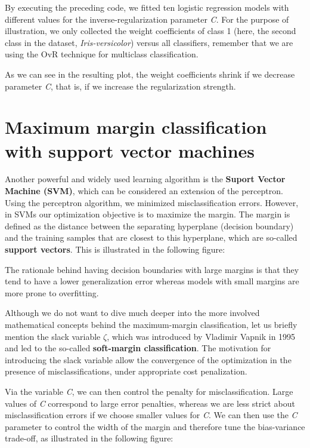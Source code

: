 \documentclass[11pt]{article}
\begin{document}
    By executing the preceding code, we fitted ten logistic regression
models with different values for the inverse-regularization parameter
\emph{C}. For the purpose of illustration, we only collected the weight
coefficients of class 1 (here, the second class in the dataset,
\emph{Iris-versicolor}) versus all classifiers, remember that we are
using the OvR technique for multiclass classification.

As we can see in the resulting plot, the weight coefficients shrink if
we decrease parameter \emph{C}, that is, if we increase the
regularization strength.

    \section{Maximum margin classification with support vector
machines}\label{maximum-margin-classification-with-support-vector-machines}

    Another powerful and widely used learning algorithm is the
\textbf{Suport Vector Machine (SVM)}, which can be considered an
extension of the perceptron. Using the perceptron algorithm, we
minimized misclassification errors. However, in SVMs our optimization
objective is to maximize the margin. The margin is defined as the
distance between the separating hyperplane (decision boundary) and the
training samples that are closest to this hyperplane, which are
so-called \textbf{support vectors}. This is illustrated in the following
figure:

The rationale behind having decision boundaries with large margins is
that they tend to have a lower generalization error whereas models with
small margins are more prone to overfitting.

Although we do not want to dive much deeper into the more involved
mathematical concepts behind the maximum-margin classification, let us
briefly mention the slack variable \(\zeta\), which was introduced by
Vladimir Vapnik in 1995 and led to the so-called \textbf{soft-margin
classification}. The motivation for introducing the slack variable allow
the convergence of the optimization in the presence of
misclassifications, under appropriate cost penalization.

Via the variable \emph{C}, we can then control the penalty for
misclassification. Large values of \emph{C} correspond to large error
penalties, whereas we are less strict about misclassification errors if
we choose smaller values for \emph{C}. We can then use the \emph{C}
parameter to control the width of the margin and therefore tune the
bias-variance trade-off, as illustrated in the following figure:
\end{document}

